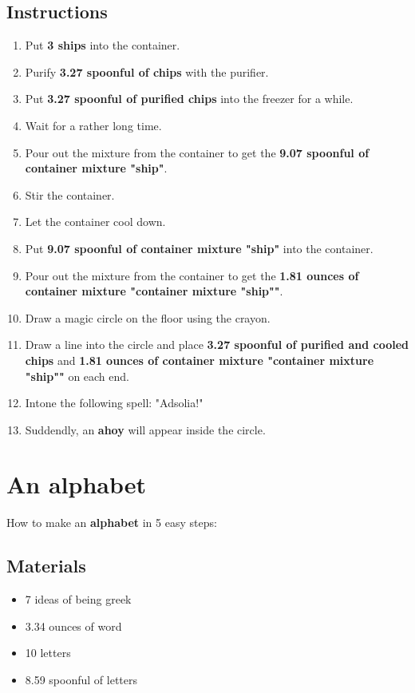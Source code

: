 \documentclass{article}
\begin{document}
\subsection{Instructions}\begin{enumerate}
\item 
Put \textbf{3 ships} into the container.
\item 
Purify \textbf{3.27 spoonful of chips} with the purifier.
\item 
Put \textbf{3.27 spoonful of purified chips} into the freezer for a while.
\item 
Wait for a rather long time.
\item 
Pour out the mixture from the container to get the \textbf{9.07 spoonful of container mixture "ship"}.
\item 
Stir the container.
\item 
Let the container cool down.
\item 
Put \textbf{9.07 spoonful of container mixture "ship"} into the container.
\item 
Pour out the mixture from the container to get the \textbf{1.81 ounces of container mixture "container mixture "ship""}.
\item 
Draw a magic circle on the floor using the crayon.
\item 
Draw a line into the circle and place \textbf{3.27 spoonful of purified and cooled chips} and \textbf{1.81 ounces of container mixture "container mixture "ship""} on each end.
\item 
Intone the following spell: "Adsolia!"
\item 
Suddendly, an \textbf{ahoy} will appear inside the circle.
\end{enumerate}
\newpage
\section{An alphabet}How to make an \textbf{alphabet} in 5 easy steps:

\subsection{Materials}\begin{itemize}
\item 
7 ideas of being greek
\item 
3.34 ounces of word
\item 
10 letters
\item 
8.59 spoonful of letters
\end{itemize}
\end{document}
